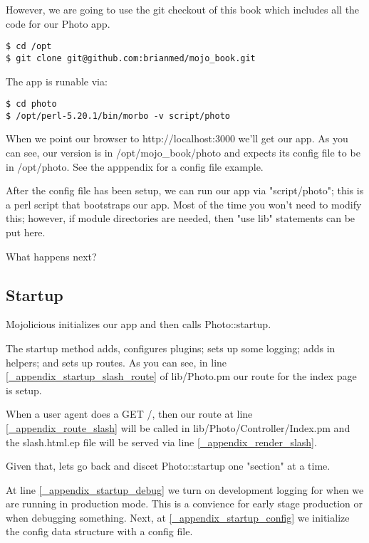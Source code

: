 \documentclass[16pt,pdftex]{book}
\begin{document}
However, we are going to use the git checkout of this book which includes all the 
code for our Photo app.

\begin{lstlisting}[style=BashOutputStyle]
$ cd /opt
$ git clone git@github.com:brianmed/mojo_book.git
\end{lstlisting}

The app is runable via:

\begin{lstlisting}[style=BashInputStyle]
$ cd photo
$ /opt/perl-5.20.1/bin/morbo -v script/photo
\end{lstlisting}

When we point our browser to http://localhost:3000 we'll get our app.  As you
can see, our version is in /opt/mojo\_book/photo and expects its config file to
be in /opt/photo.  See the apppendix for a config file example.

After the config file has been setup, we can run our app via "script/photo";
this is a perl script that bootstraps our app.  Most of the time you won't need
to modify this; however, if module directories are needed, then "use lib" statements
can be put here.

What happens next?

\subsection{Startup}

Mojolicious initializes our app and then calls Photo::startup.

The startup method adds, configures plugins; sets up some logging; adds in helpers;
and sets up routes.  As you can see, in line \ref{_appendix_startup_slash_route} of lib/Photo.pm 
our route for the index page is setup.

When a user agent does a GET /, then our route at line \ref{_appendix_route_slash} will be 
called in lib/Photo/Controller/Index.pm and the slash.html.ep file will be served via
line \ref{_appendix_render_slash}.

Given that, lets go back and discet Photo::startup one "section" at a time.

At line \ref{_appendix_startup_debug} we turn on development logging for when
we are running in production mode.  This is a convience for early stage
production or when debugging something.  Next, at
\ref{_appendix_startup_config} we initialize the config data structure with a
config file.
\end{document}
